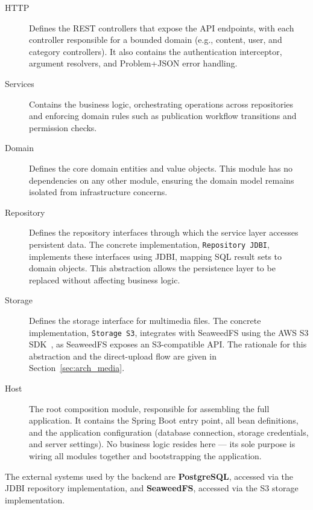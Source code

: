 \begin{description}
    \item[HTTP] Defines the REST controllers that expose the API endpoints, with each
          controller responsible for a bounded domain (e.g., content, user, and category
          controllers). It also contains the authentication interceptor, argument resolvers,
          and Problem+JSON error handling.

    \item[Services] Contains the business logic, orchestrating operations across
          repositories and enforcing domain rules such as publication workflow transitions
          and permission checks.

    \item[Domain] Defines the core domain entities and value objects. This module
          has no dependencies on any other module, ensuring the domain model remains
          isolated from infrastructure concerns.

    \item[Repository] Defines the repository interfaces through which the service
          layer accesses persistent data. The concrete implementation, \texttt{Repository JDBI},
          implements these interfaces using JDBI, mapping SQL result sets to domain objects.
          This abstraction allows the persistence layer to be replaced without affecting
          business logic.

    \item[Storage] Defines the storage interface for multimedia files. The concrete
          implementation, \texttt{Storage S3}, integrates with SeaweedFS using the AWS S3
          SDK~\cite{aws_s3_sdk}, as SeaweedFS exposes an S3-compatible API. The rationale
          for this abstraction and the direct-upload flow are given in
          Section~\ref{sec:arch_media}.

    \item[Host] The root composition module, responsible for assembling the full
          application. It contains the Spring Boot entry point, all bean definitions, and
          the application configuration (database connection, storage credentials, and server
          settings). No business logic resides here --- its sole purpose is wiring all
          modules together and bootstrapping the application.
\end{description}

The external systems used by the backend are \textbf{PostgreSQL}, accessed via the
JDBI repository implementation, and \textbf{SeaweedFS}, accessed via the S3 storage
implementation.

